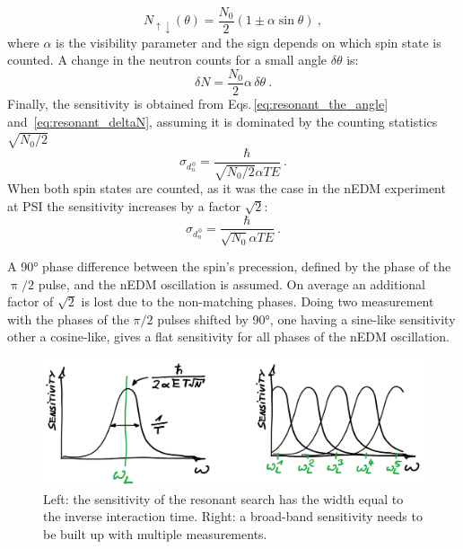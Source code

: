 \begin{equation}
  N_{\uparrow \downarrow}(\theta) = \frac{N_0}{2} \left( 1 \pm \alpha \sin \theta  \right)  \ ,
\end{equation}
where $\alpha$ is the visibility parameter and the sign depends on which spin state is counted. A change in the neutron counts for a small angle $\delta \theta$ is:
\begin{equation}
  \delta N = \frac{N_0}{2} \alpha \, \delta \theta \ .
  \label{eq:resonant_deltaN}
\end{equation}
Finally, the sensitivity is obtained from Eqs.\,\ref{eq:resonant_the_angle} and~\ref{eq:resonant_deltaN}, assuming it is dominated by the counting statistics $\sqrt{N_0/2}$
\begin{equation}
  \sigma_{d_n^{\,0}} = \frac{\hbar}{\sqrt{N_0/2} \alpha T E} \ .
\end{equation}
When both spin states are counted, as it was the case in the nEDM experiment at PSI the sensitivity increases by a factor $\sqrt{2}$:
\begin{equation}
  \sigma_{d_n^{\,0}} = \frac{\hbar}{\sqrt{N_0} \alpha T E} \ .
\end{equation}

A \ang{90} phase difference between the spin's precession, defined by the phase of the $\uppi/2$ pulse, and the nEDM oscillation is assumed. On average an additional factor of $\sqrt{2}$ is lost due to the non-matching phases.
Doing two measurement with the phases of the $\pi/2$ pulses shifted by \ang{90}, one having a sine-like sensitivity other a cosine-like, gives a flat sensitivity for all phases of the nEDM oscillation.

\begin{figure}
  \centering
  \includegraphics[width=\linewidth]{gfx/axions/resonant_sensitivity.png}
  \caption{Left: the sensitivity of the resonant search has the width equal to the inverse interaction time. Right: a broad-band sensitivity needs to be built up with multiple measurements.}\label{fig:axions_resonant_sensitivity}
\end{figure}

